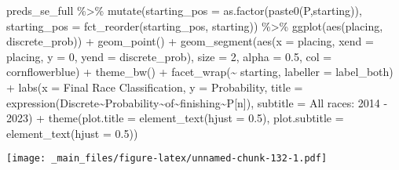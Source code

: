 \documentclass[
]{book}
\newenvironment{Shaded}{\begin{snugshade}}{\end{snugshade}}
\newcommand{\AttributeTok}[1]{\textcolor[rgb]{0.77,0.63,0.00}{#1}}
\newcommand{\DecValTok}[1]{\textcolor[rgb]{0.00,0.00,0.81}{#1}}
\newcommand{\FloatTok}[1]{\textcolor[rgb]{0.00,0.00,0.81}{#1}}
\newcommand{\FunctionTok}[1]{\textcolor[rgb]{0.00,0.00,0.00}{#1}}
\newcommand{\NormalTok}[1]{#1}
\newcommand{\SpecialCharTok}[1]{\textcolor[rgb]{0.00,0.00,0.00}{#1}}
\newcommand{\StringTok}[1]{\textcolor[rgb]{0.31,0.60,0.02}{#1}}
\begin{document}
\begin{Shaded}
\begin{Highlighting}[]
\NormalTok{preds\_se\_full }\SpecialCharTok{\%\textgreater{}\%}
  \FunctionTok{mutate}\NormalTok{(}\AttributeTok{starting\_pos =} \FunctionTok{as.factor}\NormalTok{(}\FunctionTok{paste0}\NormalTok{(}\StringTok{\textquotesingle{}P\textquotesingle{}}\NormalTok{,starting)),}
         \AttributeTok{starting\_pos =} \FunctionTok{fct\_reorder}\NormalTok{(starting\_pos, starting)) }\SpecialCharTok{\%\textgreater{}\%}
  \FunctionTok{ggplot}\NormalTok{(}\FunctionTok{aes}\NormalTok{(placing, discrete\_prob)) }\SpecialCharTok{+}
  \FunctionTok{geom\_point}\NormalTok{() }\SpecialCharTok{+}
  \FunctionTok{geom\_segment}\NormalTok{(}\FunctionTok{aes}\NormalTok{(}\AttributeTok{x =}\NormalTok{ placing, }\AttributeTok{xend =}\NormalTok{ placing, }\AttributeTok{y =} \DecValTok{0}\NormalTok{, }\AttributeTok{yend =}\NormalTok{ discrete\_prob),}
               \AttributeTok{size =} \DecValTok{2}\NormalTok{, }\AttributeTok{alpha =} \FloatTok{0.5}\NormalTok{, }\AttributeTok{col =} \StringTok{\textquotesingle{}cornflowerblue\textquotesingle{}}\NormalTok{) }\SpecialCharTok{+}
  \FunctionTok{theme\_bw}\NormalTok{() }\SpecialCharTok{+}
  \FunctionTok{facet\_wrap}\NormalTok{(}\SpecialCharTok{\textasciitilde{}}\NormalTok{ starting, }\AttributeTok{labeller =}\NormalTok{ label\_both) }\SpecialCharTok{+}
  \FunctionTok{labs}\NormalTok{(}\AttributeTok{x =} \StringTok{\textquotesingle{}Final Race Classification\textquotesingle{}}\NormalTok{,}
       \AttributeTok{y =} \StringTok{\textquotesingle{}Probability\textquotesingle{}}\NormalTok{,}
       \AttributeTok{title =} \FunctionTok{expression}\NormalTok{(Discrete}\SpecialCharTok{\textasciitilde{}}\NormalTok{Probability}\SpecialCharTok{\textasciitilde{}}\NormalTok{of}\SpecialCharTok{\textasciitilde{}}\NormalTok{finishing}\SpecialCharTok{\textasciitilde{}}\NormalTok{P[n]),}
       \AttributeTok{subtitle =} \StringTok{\textquotesingle{}All races: 2014 {-} 2023\textquotesingle{}}\NormalTok{) }\SpecialCharTok{+}
  \FunctionTok{theme}\NormalTok{(}\AttributeTok{plot.title =} \FunctionTok{element\_text}\NormalTok{(}\AttributeTok{hjust =} \FloatTok{0.5}\NormalTok{),}
        \AttributeTok{plot.subtitle =} \FunctionTok{element\_text}\NormalTok{(}\AttributeTok{hjust =} \FloatTok{0.5}\NormalTok{))}
\end{Highlighting}
\end{Shaded}

\texttt{[image: \_main\_files/figure-latex/unnamed-chunk-132-1.pdf]}
\end{document}
